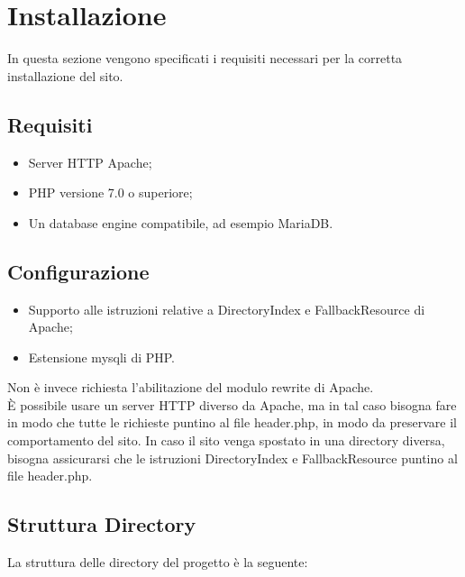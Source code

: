 \section{Installazione}
In questa sezione vengono specificati i requisiti necessari per la corretta installazione del sito.
\subsection{Requisiti}
\begin{itemize}
\item Server HTTP Apache;
\item PHP versione 7.0 o superiore;
\item Un database engine compatibile, ad esempio MariaDB.
\end{itemize}

\subsection{Configurazione}
\begin{itemize}
\item Supporto alle istruzioni relative a DirectoryIndex e FallbackResource di Apache;
\item Estensione mysqli di PHP.
\end{itemize}
Non è invece richiesta l'abilitazione del modulo rewrite di Apache.\\
È possibile usare un server HTTP diverso da Apache, ma in tal caso bisogna fare in modo che tutte le richieste puntino al file header.php, in modo da preservare il comportamento del sito.
In caso il sito venga spostato in una directory diversa, bisogna assicurarsi che le istruzioni DirectoryIndex e FallbackResource puntino al file header.php.
\newpage
\subsection{Struttura Directory}
La struttura delle directory del progetto è la seguente:

